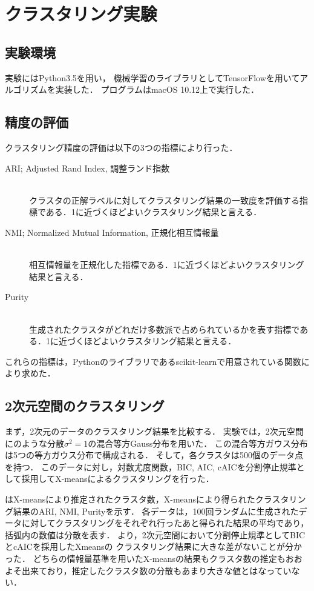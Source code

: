 \section{クラスタリング実験}

\subsection{実験環境}

実験にはPython3.5を用い，
機械学習のライブラリとしてTensorFlowを用いてアルゴリズムを実装した．
プログラムはmacOS 10.12上で実行した．

\subsection{精度の評価}

クラスタリング精度の評価は以下の3つの指標により行った．
\begin{description}
  \item[ARI; Adjusted Rand Index, 調整ランド指数]~\\
    クラスタの正解ラベルに対してクラスタリング結果の一致度を評価する指標である．1に近づくほどよいクラスタリング結果と言える．
  \item[NMI; Normalized Mutual Information, 正規化相互情報量]~\\
    相互情報量を正規化した指標である．1に近づくほどよいクラスタリング結果と言える．
  \item[Purity]~\\
    生成されたクラスタがどれだけ多数派で占められているかを表す指標である．1に近づくほどよいクラスタリング結果と言える．
\end{description}
これらの指標は，Pythonのライブラリであるscikit-learnで用意されている関数により求めた．

\subsection{2次元空間のクラスタリング}

まず，2次元のデータのクラスタリング結果を比較する．
実験では，2次元空間にのような分散$\sigma^2=1$の混合等方Gauss分布を用いた．
この混合等方ガウス分布は5つの等方ガウス分布で構成される．
そして，各クラスタは500個のデータ点を持つ．
このデータに対し，対数尤度関数，BIC, AIC, cAICを分割停止規準として採用してX-meansによるクラスタリングを行った．

はX-meansにより推定されたクラスタ数，X-meansにより得られたクラスタリング結果のARI, NMI, Purityを示す．
各データは，100回ランダムに生成されたデータに対してクラスタリングをそれぞれ行ったあと得られた結果の平均であり，括弧内の数値は分散を表す．
より，2次元空間において分割停止規準としてBICとcAICを採用したXmeansの
クラスタリング結果に大きな差がないことが分かった．
どちらの情報量基準を用いたX-meansの結果もクラスタ数の推定もおおよそ出来ており，推定したクラスタ数の分散もあまり大きな値とはなっていない．

